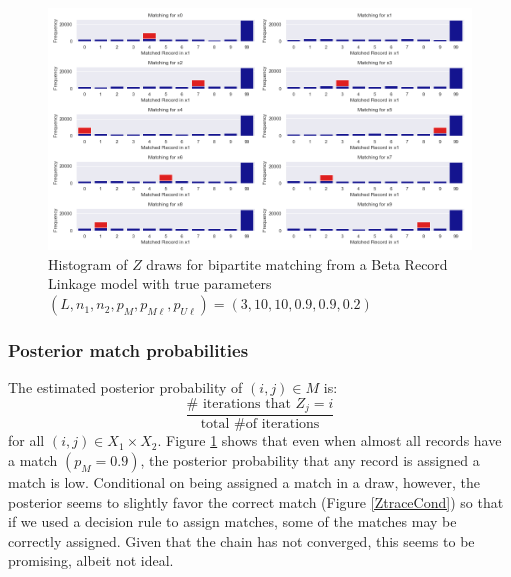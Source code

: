 \documentclass[11pt,reqno]{amsart}
\begin{document}
\begin{figure}[h!]
\begin{center}
\includegraphics[width=\textwidth]{../Figures/bpm/nM9/ZmatchesnM9_L3.png}
\caption{Histogram of $Z$ draws for bipartite matching from a Beta Record Linkage model with true parameters $(L, n_1, n_2, p_M, p_{M\ell}, p_{U\ell}) = (3, 10, 10, 0.9, 0.9, 0.2)$ }
\label{Ztrace}
\end{center}
\end{figure}

\subsubsection{Posterior match probabilities} 

The estimated posterior probability of $(i,j) \in M$ is:
$$ \frac{\# \text{ iterations that } Z_j = i}{\text{total \# of iterations}} $$
for all $(i,j)\in X_1\times X_2$.  Figure \ref{Ztrace} shows that even when almost all records have a match $(p_M = 0.9)$, the posterior probability that any record is assigned a match is low.  Conditional on being assigned a match in a draw, however, the posterior seems to slightly favor the correct match (Figure \ref{ZtraceCond}) so that if we used a decision rule to assign matches, some of the matches may be correctly assigned.  Given that the chain has not converged, this seems to be promising, albeit not ideal. 
\end{document}
